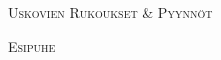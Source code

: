 \documentclass[11pt,a4paper]{book}
\renewcommand{\intestfont}[1]{{\Large\scshape\textcolor{SAGEcolor}{#1}}} %
\newcommand{\sottomomento}[1]{{\intestfont{#1}}\par\medskip}
\begin{document}
\begin{pages}
\begin{Rightside}
  \pend  
  \pstart 
  \pend 
  \pstart 
        \consintroFIN
  \pend    
  \pstart 
        \promesseFIN
  \pend
  \pstart 
  \pend 
  \pstart 
        \preghpostFIN
  \pend  
  \pstart 
  \pend 
  \pstart 
        \benedizioneanelliFIN[2]
  \pend  
  \pstart 
  \vspace{0.2in}  
        \consegnanelloFIN
  \pend  
  \pstart 
  \vspace{0.5in}
        \sottomomento{Uskovien Rukoukset \& Pyynnöt}
  \pend 
  \pstart 
  \vspace{0.2in}  
        \introfedeliFIN
  \pend   
  \pstart 
        \preghierefedeliFIN
  \pend    
  \pstart 
        \introlitanieFIN
  \pend    
  \pstart 
        \litanieFIN
  \pend  
  \pstart
        \vspace{0.5in} 
        \cantoLiturgiaEucaristicaFIN
  \pend 
  \pstart 
  \pend 
  \pstart 
  \vspace{0.5in}
        \sottomomento{Esipuhe}
  \pend 
  \pstart 
  \vspace{0.3in}
        \prefazioFIN
  \pend  
  \pstart 
  \vspace{-0.1in}  
        \pregheucarIIFIN
  \pend  
  \endnumbering
\end{Rightside}
\end{pages}
\Pages
\end{document}

